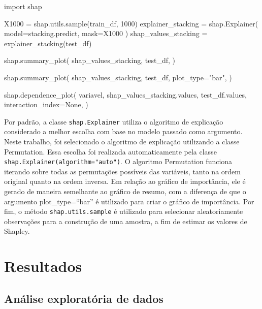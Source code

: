 \documentclass[
  12pt,
  a4paper,
]{scrreprt}
\newenvironment{Shaded}{}{}
\newcommand{\DecValTok}[1]{\textcolor[rgb]{0.00,0.36,0.77}{#1}}
\newcommand{\ImportTok}[1]{\textcolor[rgb]{0.01,0.18,0.38}{#1}}
\newcommand{\NormalTok}[1]{\textcolor[rgb]{0.14,0.16,0.18}{#1}}
\newcommand{\OperatorTok}[1]{\textcolor[rgb]{0.14,0.16,0.18}{#1}}
\newcommand{\StringTok}[1]{\textcolor[rgb]{0.01,0.18,0.38}{#1}}
\newcommand{\VariableTok}[1]{\textcolor[rgb]{0.89,0.38,0.04}{#1}}
\begin{document}
\begin{Shaded}
\begin{Highlighting}[]
\ImportTok{import}\NormalTok{ shap}

\NormalTok{X1000 }\OperatorTok{=}\NormalTok{ shap.utils.sample(train\_df, }\DecValTok{1000}\NormalTok{)}
\NormalTok{explainer\_stacking }\OperatorTok{=}\NormalTok{ shap.Explainer(}
\NormalTok{    model}\OperatorTok{=}\NormalTok{stacking.predict,}
\NormalTok{    mask}\OperatorTok{=}\NormalTok{X1000}
\NormalTok{    )}
\NormalTok{shap\_values\_stacking }\OperatorTok{=}\NormalTok{ explainer\_stacking(test\_df)}

\NormalTok{shap.summary\_plot(}
\NormalTok{    shap\_values\_stacking,}
\NormalTok{    test\_df,}
\NormalTok{    )}

\NormalTok{shap.summary\_plot(}
\NormalTok{    shap\_values\_stacking,}
\NormalTok{    test\_df,}
\NormalTok{    plot\_type}\OperatorTok{=}\StringTok{"bar"}\NormalTok{,}
\NormalTok{    )}

\NormalTok{shap.dependence\_plot(}
\NormalTok{    variavel,}
\NormalTok{    shap\_values\_stacking.values,}
\NormalTok{    test\_df.values,}
\NormalTok{    interaction\_index}\OperatorTok{=}\VariableTok{None}\NormalTok{,}
\NormalTok{    )}
\end{Highlighting}
\end{Shaded}

Por padrão, a classe \texttt{shap.Explainer} utiliza o algoritmo de
explicação considerado a melhor escolha com base no modelo passado como
argumento. Neste trabalho, foi selecionado o algoritmo de explicação
utilizando a classe Permutation. Essa escolha foi realizada
automaticamente pela classe \texttt{shap.Explainer(algorithm="auto")}. O
algoritmo Permutation funciona iterando sobre todas as permutações
possíveis das variáveis, tanto na ordem original quanto na ordem
inversa. Em relação ao gráfico de importância, ele é gerado de maneira
semelhante ao gráfico de resumo, com a diferença de que o argumento
plot\_type=``bar'' é utilizado para criar o gráfico de importância. Por
fim, o método \texttt{shap.utils.sample} é utilizado para selecionar
aleatoriamente observações para a construção de uma amostra, a fim de
estimar os valores de Shapley.

\chapter{Resultados}\label{resultados}

\section{Análise exploratória de
dados}\label{anuxe1lise-exploratuxf3ria-de-dados-1}
\end{document}
